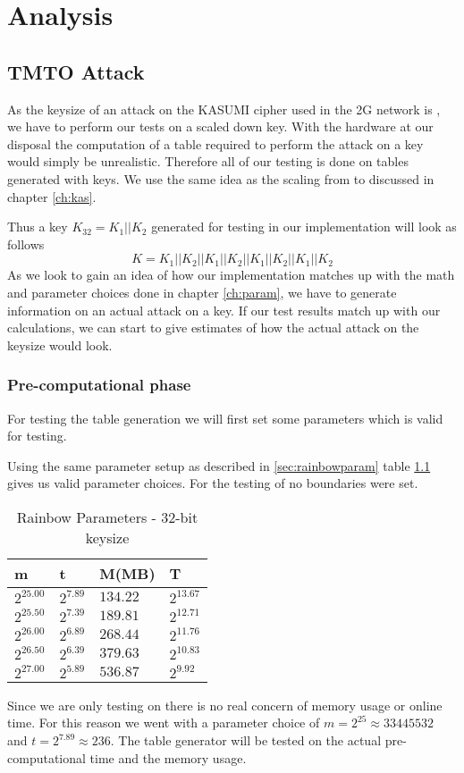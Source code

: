 \chapter{Analysis}
\label{ch:anal}

\section{TMTO Attack}
As the keysize of an attack on the KASUMI cipher used in the 2G
network is , we have to perform our tests on a scaled down
key. With the hardware at our disposal the computation of a table
required to perform the attack on a  key would simply be
unrealistic. Therefore all of our testing is done on tables generated
with  keys. We use the same idea as the scaling from  to
 discussed in chapter \ref{ch:kas}.

Thus a key $K_{32} = K_1 || K_2$ generated for testing in our  implementation will
look as follows
\[K = K_1 || K_2 || K_1 || K_2 || K_1 || K_2 || K_1 || K_2\]
As we look to gain an idea of how our implementation matches up with
the math and parameter choices done in chapter \ref{ch:param}, we have to generate
information on an actual attack on a  key. If our  test
results match up with our calculations, we can start to give estimates
of how the actual attack on the  keysize would look.
\subsection{Pre-computational phase}
For testing the table generation we will first set some parameters
which is valid for  testing.

Using the same parameter setup as described in \ref{sec:rainbowparam}
table \ref{tab:rainparam32} gives us valid parameter choices. For the
testing of  no boundaries were set.
\begin{table}[H]
  \centering
  \begin{tabular}{llll}
    m & t & M(MB) & T \\ \hline
    $2^{25.00}$ & $2^{7.89}$ & $134.22$ & $2^{13.67}$ \\
    $2^{25.50}$ & $2^{7.39}$ & $189.81$ & $2^{12.71}$ \\
    $2^{26.00}$ & $2^{6.89}$ & $268.44$ & $2^{11.76}$ \\
    $2^{26.50}$ & $2^{6.39}$ & $379.63$ & $2^{10.83}$ \\
    $2^{27.00}$ & $2^{5.89}$ & $536.87$ & $2^{9.92}$ \\
  \end{tabular}
  \caption{Rainbow Parameters - 32-bit keysize}
  \label{tab:rainparam32}
\end{table}
Since we are only testing on  there is no real concern of
memory usage or online time. For this reason we went with a parameter
choice of $m=2^{25} \approx 33445532$ and $t= 2^{7.89} \approx
236$. The table generator will be tested on the actual
pre-computational time and the memory usage.

